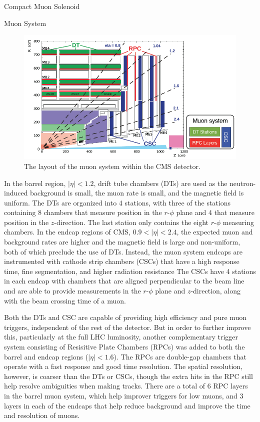 \begin{section}{Compact Muon Solenoid}
\begin{subsection}{Muon System}
\begin{figure}[tbp!]
\begin{center}
\includegraphics[angle=0,width=0.80\columnwidth]{fig/cms_muonsys.png}
\end{center}
\caption{The layout of the muon system within the CMS detector.~\cite{1748-0221-8-04-P04005}}
\label{fig:cms_muonsys}
\end{figure}

In the barrel region, $|\eta| < 1.2$, drift tube chambers (DTs) are used as the neutron-induced background is small, the muon rate is small, and the magnetic field is uniform.
The DTs are organized into 4 stations, with three of the stations containing 8 chambers that measure position in the $r$-$\phi$ plane and 4 that measure position in the $z$-direction.
The last station only contains the eight $r$-$\phi$ measuring chambers.
In the endcap regions of CMS, $0.9 < |\eta| < 2.4$, the expected muon and background rates are higher and the magnetic field is large and non-uniform, both of which preclude the use of DTs.
Instead, the muon system endcaps are instrumented with cathode strip chambers (CSCs) that have a high response time, fine segmentation, and higher radiation resistance
The CSCs have 4 stations in each endcap with chambers that are aligned perpendicular to the beam line and are able to provide measurements in the $r$-$\phi$ plane and $z$-direction, along with the beam crossing time of a muon.

Both the DTs and CSC are capable of providing high efficiency and pure muon \pT triggers, independent of the rest of the detector.
But in order to further improve this, particularly at the full LHC luminosity, another complementary trigger system consisting of Resisitive Plate Chambers (RPCs) was added to both the barrel and endcap regions ($|\eta| < 1.6$).
The RPCs are double-gap chambers that operate with a fast response and good time resolution.
The spatial resolution, however, is coarser than the DTs or CSCs, though the extra hits in the RPC still help resolve ambiguities when making tracks.
There are a total of 6 RPC layers in the barrel muon system, which help improver triggers for low \pT muons, and 3 layers in each of the endcaps that help reduce background and improve the time and \pT resolution of muons.


\end{subsection}
\end{section}
